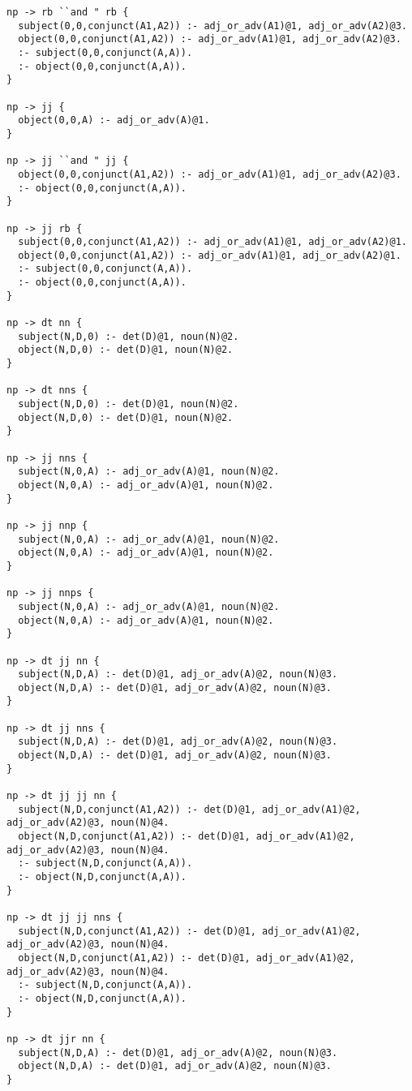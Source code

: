 \begin{lstlisting}
np -> rb ``and " rb {
  subject(0,0,conjunct(A1,A2)) :- adj_or_adv(A1)@1, adj_or_adv(A2)@3.
  object(0,0,conjunct(A1,A2)) :- adj_or_adv(A1)@1, adj_or_adv(A2)@3.
  :- subject(0,0,conjunct(A,A)).
  :- object(0,0,conjunct(A,A)).
}

np -> jj {
  object(0,0,A) :- adj_or_adv(A)@1.
}

np -> jj ``and " jj {
  object(0,0,conjunct(A1,A2)) :- adj_or_adv(A1)@1, adj_or_adv(A2)@3.
  :- object(0,0,conjunct(A,A)).
}

np -> jj rb {
  subject(0,0,conjunct(A1,A2)) :- adj_or_adv(A1)@1, adj_or_adv(A2)@1.
  object(0,0,conjunct(A1,A2)) :- adj_or_adv(A1)@1, adj_or_adv(A2)@1.
  :- subject(0,0,conjunct(A,A)).
  :- object(0,0,conjunct(A,A)).
}

np -> dt nn {
  subject(N,D,0) :- det(D)@1, noun(N)@2.
  object(N,D,0) :- det(D)@1, noun(N)@2.
}

np -> dt nns {
  subject(N,D,0) :- det(D)@1, noun(N)@2.
  object(N,D,0) :- det(D)@1, noun(N)@2.
}

np -> jj nns {
  subject(N,0,A) :- adj_or_adv(A)@1, noun(N)@2.
  object(N,0,A) :- adj_or_adv(A)@1, noun(N)@2.
}

np -> jj nnp {
  subject(N,0,A) :- adj_or_adv(A)@1, noun(N)@2.
  object(N,0,A) :- adj_or_adv(A)@1, noun(N)@2.
}

np -> jj nnps {
  subject(N,0,A) :- adj_or_adv(A)@1, noun(N)@2.
  object(N,0,A) :- adj_or_adv(A)@1, noun(N)@2.
}

np -> dt jj nn {
  subject(N,D,A) :- det(D)@1, adj_or_adv(A)@2, noun(N)@3.
  object(N,D,A) :- det(D)@1, adj_or_adv(A)@2, noun(N)@3.
}

np -> dt jj nns {
  subject(N,D,A) :- det(D)@1, adj_or_adv(A)@2, noun(N)@3.
  object(N,D,A) :- det(D)@1, adj_or_adv(A)@2, noun(N)@3.
}

np -> dt jj jj nn {
  subject(N,D,conjunct(A1,A2)) :- det(D)@1, adj_or_adv(A1)@2, adj_or_adv(A2)@3, noun(N)@4.
  object(N,D,conjunct(A1,A2)) :- det(D)@1, adj_or_adv(A1)@2, adj_or_adv(A2)@3, noun(N)@4.
  :- subject(N,D,conjunct(A,A)).
  :- object(N,D,conjunct(A,A)).
}

np -> dt jj jj nns {
  subject(N,D,conjunct(A1,A2)) :- det(D)@1, adj_or_adv(A1)@2, adj_or_adv(A2)@3, noun(N)@4.
  object(N,D,conjunct(A1,A2)) :- det(D)@1, adj_or_adv(A1)@2, adj_or_adv(A2)@3, noun(N)@4.
  :- subject(N,D,conjunct(A,A)).
  :- object(N,D,conjunct(A,A)).
}

np -> dt jjr nn {
  subject(N,D,A) :- det(D)@1, adj_or_adv(A)@2, noun(N)@3.
  object(N,D,A) :- det(D)@1, adj_or_adv(A)@2, noun(N)@3.
}


\end{lstlisting}
